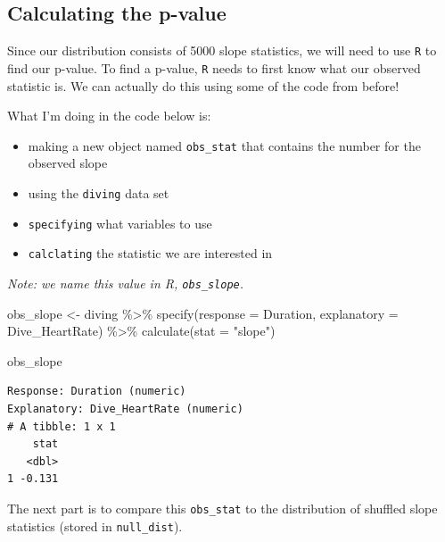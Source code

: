 \documentclass[
  letterpaper,
  DIV=11,
  numbers=noendperiod]{scrartcl}
\newenvironment{Shaded}{\begin{snugshade}}{\end{snugshade}}
\newcommand{\AttributeTok}[1]{\textcolor[rgb]{0.40,0.45,0.13}{#1}}
\newcommand{\FunctionTok}[1]{\textcolor[rgb]{0.28,0.35,0.67}{#1}}
\newcommand{\NormalTok}[1]{\textcolor[rgb]{0.00,0.23,0.31}{#1}}
\newcommand{\OtherTok}[1]{\textcolor[rgb]{0.00,0.23,0.31}{#1}}
\newcommand{\SpecialCharTok}[1]{\textcolor[rgb]{0.37,0.37,0.37}{#1}}
\newcommand{\StringTok}[1]{\textcolor[rgb]{0.13,0.47,0.30}{#1}}
\providecommand{\tightlist}{%
  \setlength{\itemsep}{0pt}\setlength{\parskip}{0pt}}\usepackage{longtable,booktabs,array}
\begin{document}

\hypertarget{calculating-the-p-value}{%
\subsection{Calculating the p-value}\label{calculating-the-p-value}}

Since our distribution consists of 5000 slope statistics, we will need
to use \texttt{R} to find our p-value. To find a p-value, \texttt{R}
needs to first know what our observed statistic is. We can actually do
this using some of the code from before!

What I'm doing in the code below is:

\begin{itemize}
\tightlist
\item
  making a new object named \texttt{obs\_stat} that contains the number
  for the observed slope
\item
  using the \texttt{diving} data set
\item
  \texttt{specifying} what variables to use
\item
  \texttt{calclating} the statistic we are interested in
\end{itemize}

\emph{Note: we name this value in R, \texttt{obs\_slope}.}

\begin{Shaded}
\begin{Highlighting}[]
\NormalTok{obs\_slope }\OtherTok{\textless{}{-}}\NormalTok{ diving }\SpecialCharTok{\%\textgreater{}\%} 
  \FunctionTok{specify}\NormalTok{(}\AttributeTok{response =}\NormalTok{ Duration, }
          \AttributeTok{explanatory =}\NormalTok{ Dive\_HeartRate) }\SpecialCharTok{\%\textgreater{}\%} 
  \FunctionTok{calculate}\NormalTok{(}\AttributeTok{stat =} \StringTok{"slope"}\NormalTok{)}

\NormalTok{obs\_slope}
\end{Highlighting}
\end{Shaded}

\begin{verbatim}
Response: Duration (numeric)
Explanatory: Dive_HeartRate (numeric)
# A tibble: 1 x 1
    stat
   <dbl>
1 -0.131
\end{verbatim}

The next part is to compare this \texttt{obs\_stat} to the distribution
of shuffled slope statistics (stored in \texttt{null\_dist}).
\end{document}
